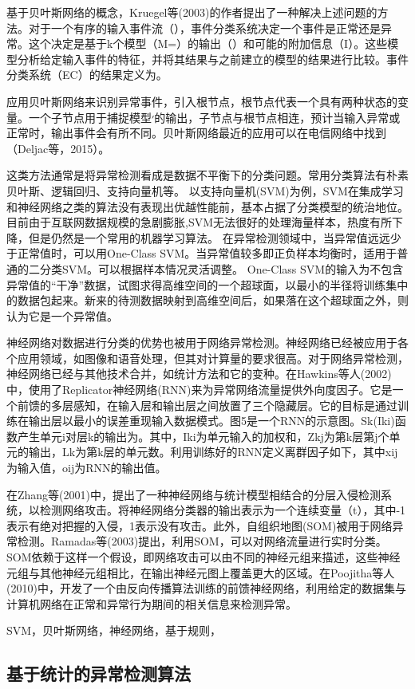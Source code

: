 基于贝叶斯网络的概念，Kruegel等(2003)的作者提出了一种解决上述问题的方法。对于一个有序的输入事件流（），事件分类系统决定一个事件是正常还是异常。这个决定是基于k个模型（M=）的输出（）和可能的附加信息（I）。这些模型分析给定输入事件的特征，并将其结果与之前建立的模型的结果进行比较。事件分类系统（EC）的结果定义为。

应用贝叶斯网络来识别异常事件，引入根节点，根节点代表一个具有两种状态的变量。一个子节点用于捕捉模型׳的输出，子节点与根节点相连，预计当输入异常或正常时，输出事件会有所不同。贝叶斯网络最近的应用可以在电信网络中找到（Deljac等，2015）。

这类方法通常是将异常检测看成是数据不平衡下的分类问题。常用分类算法有朴素贝叶斯、逻辑回归、支持向量机等。
以支持向量机(SVM)为例，SVM在集成学习和神经网络之类的算法没有表现出优越性能前，基本占据了分类模型的统治地位。
目前由于互联网数据规模的急剧膨胀,SVM无法很好的处理海量样本，热度有所下降，但是仍然是一个常用的机器学习算法。
在异常检测领域中，当异常值远远少于正常值时，可以用One-Class SVM。当异常值较多即正负样本均衡时，适用于普通的二分类SVM。可以根据样本情况灵活调整。
One-Class SVM的输入为不包含异常值的“干净”数据，试图求得高维空间的一个超球面，以最小的半径将训练集中的数据包起来。新来的待测数据映射到高维空间后，如果落在这个超球面之外，则认为它是一个异常值。

神经网络对数据进行分类的优势也被用于网络异常检测。神经网络已经被应用于各个应用领域，如图像和语音处理，但其对计算量的要求很高。对于网络异常检测，神经网络已经与其他技术合并，如统计方法和它的变种。在Hawkins等人(2002)中，使用了Replicator神经网络(RNN)来为异常网络流量提供外向度因子。它是一个前馈的多层感知，在输入层和输出层之间放置了三个隐藏层。它的目标是通过训练在输出层以最小的误差重现输入数据模式。图5是一个RNN的示意图。Sk(Iki)函数产生单元i对层k的输出为。其中，Iki为单元输入的加权和，Zkj为第k层第j个单元的输出，Lk为第k层的单元数。利用训练好的RNN定义离群因子如下，其中xij为输入值，oij为RNN的输出值。

在Zhang等(2001)中，提出了一种神经网络与统计模型相结合的分层入侵检测系统，以检测网络攻击。将神经网络分类器的输出表示为一个连续变量（t），其中-1表示有绝对把握的入侵，1表示没有攻击。此外，自组织地图(SOM)被用于网络异常检测。Ramadas等(2003)提出，利用SOM，可以对网络流量进行实时分类。SOM依赖于这样一个假设，即网络攻击可以由不同的神经元组来描述，这些神经元组与其他神经元组相比，在输出神经元图上覆盖更大的区域。在Poojitha等人(2010)中，开发了一个由反向传播算法训练的前馈神经网络，利用给定的数据集与计算机网络在正常和异常行为期间的相关信息来检测异常。

SVM，贝叶斯网络，神经网络，基于规则，
\subsection{基于统计的异常检测算法}

